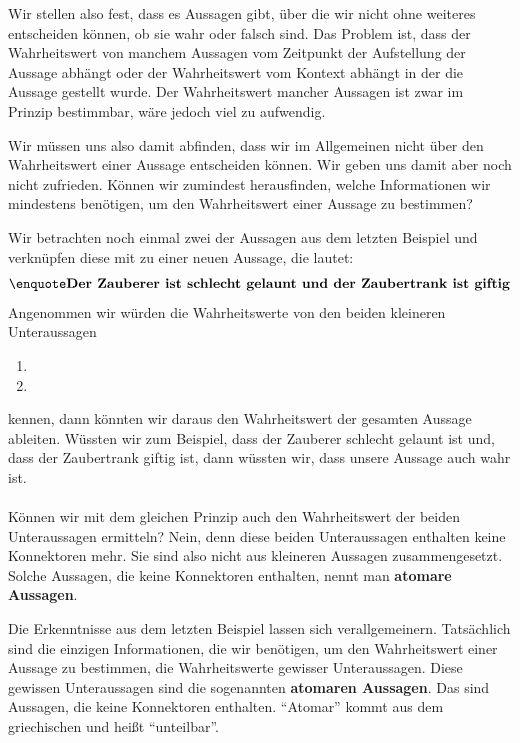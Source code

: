 \documentclass[../../main.tex]{subfiles}
\begin{document}
Wir stellen also fest, dass es Aussagen gibt, über die wir nicht ohne weiteres entscheiden können, ob sie wahr oder falsch sind. Das Problem ist, dass der Wahrheitswert von manchem Aussagen vom Zeitpunkt der Aufstellung der Aussage abhängt oder der Wahrheitswert vom Kontext abhängt in der die Aussage gestellt wurde. Der Wahrheitswert mancher Aussagen ist zwar im Prinzip bestimmbar, wäre jedoch viel zu aufwendig.

Wir müssen uns also damit abfinden, dass wir im Allgemeinen nicht über den Wahrheitswert einer Aussage entscheiden können. Wir geben uns damit aber noch nicht zufrieden. Können wir zumindest herausfinden, welche Informationen wir mindestens benötigen, um den Wahrheitswert einer Aussage zu bestimmen?

\begin{example}{}
Wir betrachten noch einmal zwei der Aussagen aus dem letzten Beispiel und verknüpfen diese mit  zu einer neuen Aussage, die lautet:
\[\statement{Der Zauberer ist schlecht gelaunt und der Zaubertrank ist giftig}\]
Angenommen wir würden die Wahrheitswerte von den beiden kleineren Unteraussagen
\begin{enumerate}
    \item {}
    \item {}
\end{enumerate}
kennen, dann könnten wir daraus den Wahrheitswert der gesamten Aussage ableiten. Wüssten wir zum Beispiel, dass der Zauberer schlecht gelaunt ist und, dass der Zaubertrank giftig ist, dann wüssten wir, dass unsere Aussage  auch wahr ist.
\\ \\
Können wir mit dem gleichen Prinzip auch den Wahrheitswert der beiden Unteraussagen ermitteln? Nein, denn diese beiden Unteraussagen enthalten keine Konnektoren mehr. Sie sind also nicht aus kleineren Aussagen zusammengesetzt. Solche Aussagen, die keine Konnektoren enthalten, nennt man \textbf{atomare Aussagen}.
\end{example}

Die Erkenntnisse aus dem letzten Beispiel lassen sich verallgemeinern. Tatsächlich sind die einzigen Informationen, die wir benötigen, um den Wahrheitswert einer Aussage zu bestimmen, die Wahrheitswerte gewisser Unteraussagen. Diese gewissen Unteraussagen sind die sogenannten \textbf{atomaren Aussagen}. Das sind Aussagen, die keine Konnektoren enthalten. \enquote{Atomar} kommt aus dem griechischen und heißt \enquote{unteilbar}.
\end{document}

